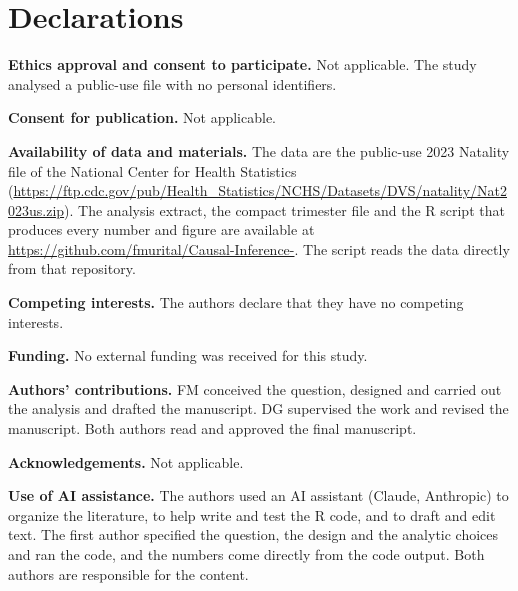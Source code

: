 \documentclass[11pt,letterpaper]{article}
\begin{document}
\section*{Declarations}
\textbf{Ethics approval and consent to participate.} Not applicable. The study analysed a public-use file with no personal identifiers.

\textbf{Consent for publication.} Not applicable.

\textbf{Availability of data and materials.} The data are the public-use 2023 Natality file of the National Center for Health Statistics (\url{https://ftp.cdc.gov/pub/Health_Statistics/NCHS/Datasets/DVS/natality/Nat2023us.zip}). The analysis extract, the compact trimester file and the R script that produces every number and figure are available at \url{https://github.com/fmurital/Causal-Inference-}. The script reads the data directly from that repository.

\textbf{Competing interests.} The authors declare that they have no competing interests.

\textbf{Funding.} No external funding was received for this study.

\textbf{Authors' contributions.} FM conceived the question, designed and carried out the analysis and drafted the manuscript. DG supervised the work and revised the manuscript. Both authors read and approved the final manuscript.

\textbf{Acknowledgements.} Not applicable.

\textbf{Use of AI assistance.} The authors used an AI assistant (Claude, Anthropic) to organize the literature, to help write and test the R code, and to draft and edit text. The first author specified the question, the design and the analytic choices and ran the code, and the numbers come directly from the code output. Both authors are responsible for the content.



\clearpage
\setcounter{table}{0}
\end{document}
